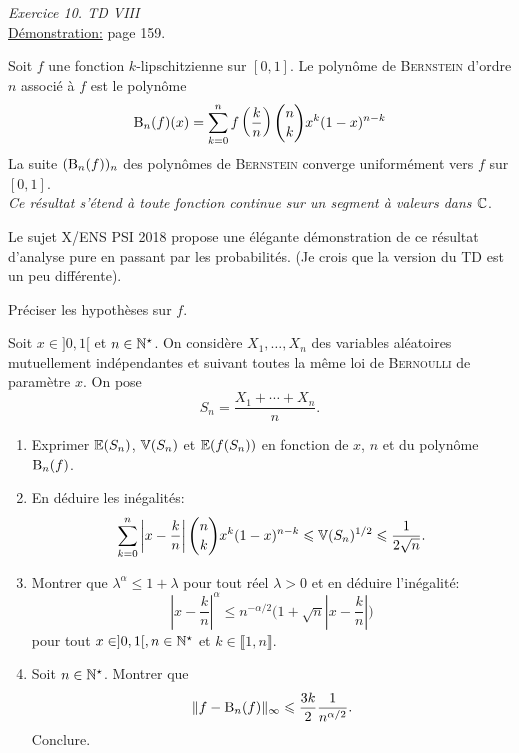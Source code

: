 \emph{Exercice 10. TD VIII} \\
\underline{Démonstration:} \cite{calcul_infinitesimal} page 159.

\begin{tcolorbox}
    Soit $f$ une fonction $k$-lipschitzienne sur $[0, 1]$. Le polynôme de \textsc{Bernstein} d'ordre $n$ associé à $f$ est le polynôme
    $$\mathrm{B}_n(f)(x) = \sum_{k=0}^{n} f \left( \frac{k}{n} \right) \binom{n}{k} x^k (1-x)^{n-k}$$
    La suite $(\mathrm{B}_n(f))_n$ des polynômes de \textsc{Bernstein} converge uniformément vers $f$ sur $[0, 1]$. \\
    \textit{Ce résultat s'étend à toute fonction continue sur un segment à valeurs dans $\mathbb{C}$}.
\end{tcolorbox}

Le sujet X/ENS PSI 2018 propose une élégante démonstration de ce résultat d'analyse pure en passant par les probabilités. (Je crois que la version du TD est un peu différente).
    
\begin{box_enonce}
    
    Préciser les hypothèses sur $f$.
        
    Soit $x \in ]0, 1[$ et $n \in \mathbb{N}^\star$. On considère $X_1, \dots, X_n$ des variables aléatoires mutuellement indépendantes et suivant toutes la même loi de \textsc{Bernoulli} de paramètre $x$. On pose
    $$S_n = \frac{X_1 + \cdots + X_n}{n}.$$
    \begin{enumerate}
        \item Exprimer $\mathbb{E}(S_n)$, $\mathbb{V}(S_n)$ et $\mathbb{E}(f(S_n))$ en fonction de $x$, $n$ et du polynôme $\mathrm{B}_n(f)$.
        \item En déduire les inégalités:
        $$\sum_{k=0}^{n} \left| x- \frac{k}{n} \right| \binom{n}{k} x^k (1-x)^{n-k} \leqslant \mathbb{V}(S_n)^{1/2} \leqslant \frac{1}{2\sqrt{n}}.$$
        \item Montrer que $\lambda^\alpha \leqslant 1+\lambda$ pour tout réel $\lambda > 0$ et en déduire l'inégalité:
        $$\left|x-\frac{k}{n} \right|^\alpha \leqslant n^{-\alpha/2} \Bigg(1 + \sqrt{n} \left|x - \frac{k}{n} \right| \Bigg)$$
        pour tout $x \in ]0, 1[, n \in \mathbb{N}^\star$ et $k \in \llbracket 1, n \rrbracket$.
        \item Soit $n \in \mathbb{N}^\star$. Montrer que 
        $$\Vert f-\mathrm{B}_n(f) \Vert_\infty \leqslant \frac{3k}{2} \frac{1}{n^{\alpha/2}}.$$
        Conclure.
    \end{enumerate}
\end{box_enonce}